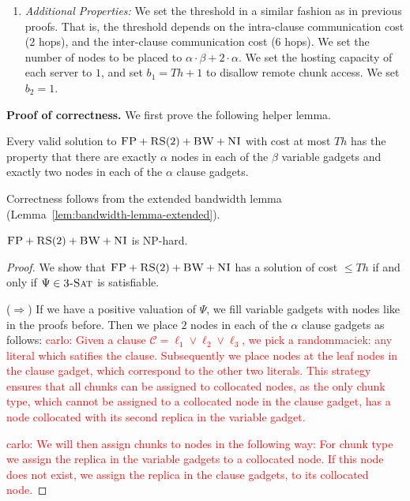 \documentclass[9pt]{sigcomm-alternate}
\newcommand{\carlo}[1]{\textcolor{red}{carlo: #1}}
\newcommand{\maciek}[1]{\textcolor{brown}{maciek: #1}}
\newcommand{\clauses}{\alpha}
\newcommand{\vars}{\beta}
\newcommand{\CC}{\textsc{NI}}
\newcommand{\FP}{\textsc{FP}}
\newcommand{\RS}{\textsc{RS}}
\newcommand{\BW}{\textsc{BW}}
\newcommand{\CostTrans}{\ensuremath{b_1}}
\newcommand{\CostCom}{\ensuremath{b_2}}
\newcommand{\TSAT}{\textsc{3-Sat}}
\newcommand{\Formula}{\ensuremath{\Psi}}
\newcommand{\Thr}{\ensuremath{Th}}
\begin{document}
\begin{appendix}
\begin{enumerate}
  \item \emph{Additional Properties:} We set
the threshold in a
    similar fashion as in previous proofs. That is,
the threshold depends on the intra-clause communication cost ($2$ hops), and the
inter-clause communication cost ($6$ hops). We
  set the number of nodes to be placed to $\clauses \cdot \vars + 2 \cdot
  \clauses$. We set the hosting capacity of each server to $1$, and set
  $\CostTrans = \Thr + 1$ to disallow remote chunk access. We set $\CostCom =
1$.


 \end{enumerate}

\textbf{Proof of correctness.}
We first prove the following helper lemma.
\begin{lemma}
Every valid solution to $\FP+\RS(2)+\BW+\CC$
with cost at most $\Thr$ has the property that
there are exactly $\clauses$ nodes in each of the $\vars$ variable gadgets
and exactly two nodes in each of the $\clauses$ clause gadgets.
\end{lemma}

Correctness follows from the extended bandwidth lemma 
(Lemma~\ref{lem:bandwidth-lemma-extended}).


\begin{theorem}
$\FP+\RS(2)+\BW+\CC$ is NP-hard.
\end{theorem}
\begin{proof}
We show that $\FP+\RS(2)+\BW+\CC$ has a solution of cost $\leq
  \Thr$ if and only if $\Formula\in \TSAT$ is satisfiable.

($\Rightarrow$) If we have a positive valuation of $\Formula$, we fill variable gadgets with nodes like in
the proofs before. Then we place $2$ nodes in each of the $\clauses$ clause 
gadgets as follows:
\carlo{Given a clause $\mathcal{C} = \ell_1 \lor \ell_2 \lor \ell_3$, we pick a 
random\maciek{any} literal which satifies the clause. Subsequently we place nodes at the 
leaf nodes in the clause gadget, which correspond to the other two literals. 
This strategy ensures that all chunks can be assigned to collocated nodes, 
as the only chunk type, which cannot be assigned to a collocated node in the 
clause gadget, has a node collocated with its second replica in the variable 
gadget.}

\carlo{We will then assign chunks to nodes in the following way: For chunk type 
we assign the replica in the variable gadgets to a collocated node. If this 
node does not exist, we assign the replica in the clause gadgets, to its 
collocated node.}


\end{proof}
\end{appendix}
\end{document}
